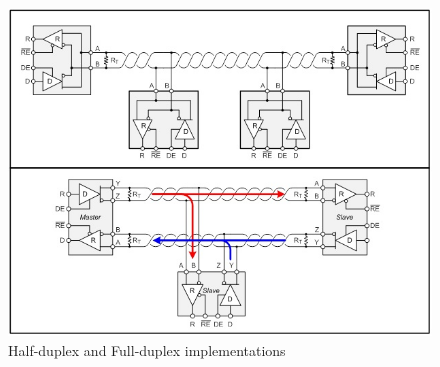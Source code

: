     \begin{figure}[!ht]
      \begin{center}
      \includegraphics[scale=0.8]{images/rs485-fullduplex-halfduplex.jpg}
      \caption{Half-duplex and Full-duplex implementations}
      \label{fig:fullHalfDuplex}
      \end{center}
    \end{figure}


